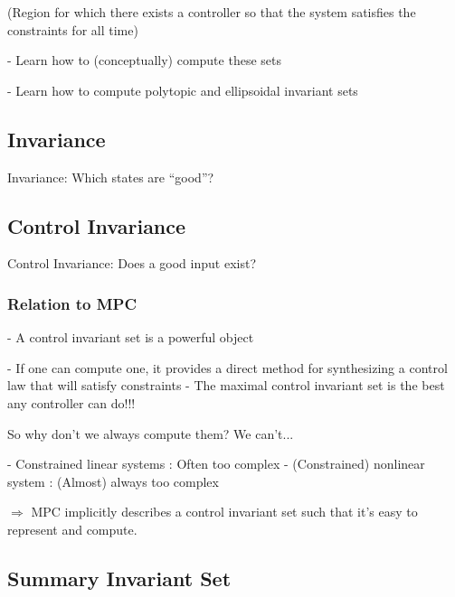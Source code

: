 (Region for which there exists a controller so that the system satisfies the constraints for all time)

- Learn how to (conceptually) compute these sets

- Learn how to compute polytopic and ellipsoidal invariant sets

\subsection{Invariance}

Invariance: Which states are “good”?


\subsection{Control Invariance}

Control Invariance: Does a good input exist?


\subsubsection{Relation to MPC}

- A control invariant set is a powerful object

- If one can compute one, it provides a direct method for synthesizing a
control law that will satisfy constraints
- The maximal control invariant set is the best any controller can do!!!

So why don’t we always compute them?
We can’t...

- Constrained linear systems : Often too complex
- (Constrained) nonlinear system : (Almost) always too complex

$\Rightarrow$ MPC implicitly describes a control invariant set
such that it’s easy to represent and compute.

\subsection{Summary Invariant Set}

